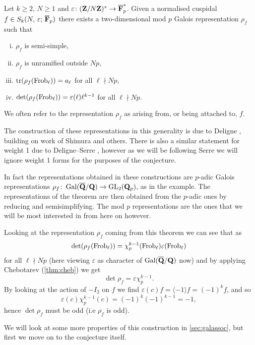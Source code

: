 \documentclass[a4paper,12pt]{article}
\begin{document}
\begin{thm}[Deligne]\label{thm:assoc}
Let $k \ge 2$, $N \ge 1$ and $\varepsilon\colon (\mathbf{Z}/N\mathbf{Z})^* \to \overline{\mathbf{F}}_p^*$. Given a normalised cuspidal $f\in S_k(N,\,\varepsilon;\,\overline{\mathbf{F}}_p)$ there exists a two-dimensional mod $p$ Galois representation $\rho_f$ such that
\begin{enumerate}[(i)]
\item $\rho_f$ is semi-simple,
\item $\rho_f$ is unramified outside $Np$,
\item $\operatorname{tr}(\rho_f (\operatorname{Frob}_\ell)) = a_\ell$ for all $\ell \nmid Np$,
\item $\det(\rho_f (\operatorname{Frob}_\ell)) = \varepsilon(\ell)\ell^{k-1}$ for all $\ell \nmid Np$.
\end{enumerate}
We often refer to the representation $\rho_f$ as arising from, or being attached to, $f$.
\end{thm}

The construction of these representations in this generality is due to Deligne \cite{Deligne,DeligneEng}, building on work of Shimura and others.
There is also a similar statement for weight 1 due to Deligne--Serre \cite{DeligneSerre}, however as we will be following Serre we will ignore weight 1 forms for the purposes of the conjecture.

In fact the representations obtained in these constructions are $p$-adic Galois representations $\rho_f\colon \operatorname{Gal}(\overline{\mathbf{Q}}/\mathbf{Q}) \to \operatorname{GL}_2(\mathbf{Q}_p)$, as in the example.
The representations of the theorem are then obtained from the $p$-adic ones by reducing and semisimplifying.
The mod $p$ representations are the ones that we will be most interested in from here on however.

\begin{rmk}\label{rmk:detrho}
Looking at the representation $\rho_f$ coming from this theorem we can see that as
\[
\det(\rho_f(\operatorname{Frob}_\ell)) = \chi_p^{k-1}(\operatorname{Frob}_\ell)\varepsilon(\operatorname{Frob}_\ell)
\]
for all $\ell \nmid Np$ (here viewing $\varepsilon$ as character of $\operatorname{Gal}(\overline{\mathbf{Q}}/\mathbf{Q})$ now) and by applying Chebotarev (\cref{thm:cheb}) we get
\[
\det\rho_f = \varepsilon\chi_p^{k-1}.
\]
By looking at the action of $-I_2$ on $f$ we find $\varepsilon(c)f = \langle -1 \rangle f = (-1)^k f$, and so
\[
\varepsilon(c)\chi_p^{k-1}(c) = (-1)^k(-1)^{k-1} = -1,
\]
hence $\det\rho_f$ must be odd (i.e $\rho_f$ is odd).
\end{rmk}

We will look at some more properties of this construction in \cref{sec:galassoc}, but first we move on to the conjecture itself.
\end{document}
